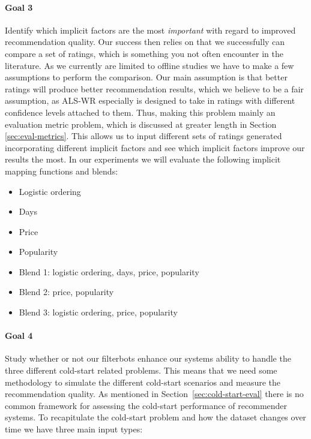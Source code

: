 \paragraph{Goal 3}

Identify which implicit factors are the most \emph{important} with regard to
improved recommendation quality. Our success then relies on that we successfully can compare
a set of ratings, which is something you not often encounter in the literature. As we currently
are limited to offline studies we have to make a few assumptions to perform the comparison.
Our main assumption is that better ratings will produce better recommendation results,
which we believe to be a fair assumption, as ALS-WR especially is designed to take
in ratings with different confidence levels attached to them. Thus, making this
problem mainly an evaluation metric problem, which is discussed at greater
length in Section \ref{sec:eval-metrics}. This allows us to input different sets
of ratings generated incorporating different implicit factors and see which implicit
factors improve our results the most. In our experiments we will evaluate the following
implicit mapping functions and blends:

\begin{itemize}
\item Logistic ordering 
\item Days
\item Price
\item Popularity
\item Blend 1: logistic ordering, days, price, popularity
\item Blend 2: price, popularity
\item Blend 3: logistic ordering, price, popularity
\end{itemize}

\paragraph{Goal 4}
\label{cold-start-methodology}

Study whether or not our filterbots enhance our systems ability to handle
the three different cold-start related problems. This means that we need some methodology
to simulate the different cold-start scenarios and measure the recommendation quality.
As mentioned in Section~\ref{sec:cold-start-eval} there is no common framework for assessing 
the cold-start performance of recommender systems. To recapitulate the cold-start problem and how
the dataset changes over time we have three main input types:

